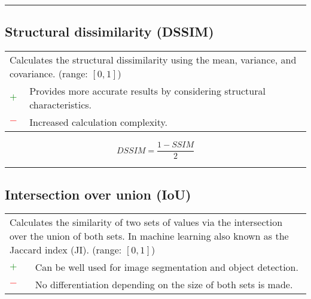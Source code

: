 \documentclass{article}
\begin{document}
\hrule


\subsection[Structural dissimilarity (DSSIM)]{Structural dissimilarity (DSSIM) \cite{wang2004image, ghodrati2019mr}}

\begin{table}[H]\centering
	\begin{tabular}{m{}m{}}
		\multicolumn{2}{m{0.95\textwidth}}{Calculates the structural dissimilarity using the mean, variance, and covariance. (range: $[0, 1]$)} \\
		\textcolor{Green}{$+$} & Provides more accurate results by considering structural characteristics. \cite{wang2004image} \\
		\textcolor{Red}{$-$}   & Increased calculation complexity.
	\end{tabular}
\end{table}

\begin{equation}
	\textit{DSSIM} = \dfrac{1 - \textit{SSIM}}{2}
%
	\label{equation:DSSIM}
\end{equation}

\hrule


\subsection[Intersection over union (IoU)]{Intersection over union (IoU) \cite{jaccard1912distribution, murphy1996finley, rezatofighi2019generalized, zou2023object}}

\begin{table}[H]\centering
	\begin{tabular}{m{}m{}}
		\multicolumn{2}{m{0.95\textwidth}}{Calculates the similarity of two sets of values via the intersection over the union of both sets. In machine learning also known as the Jaccard index (JI). (range: $[0, 1]$)} \\
		\textcolor{Green}{$+$} & Can be well used for image segmentation and object detection. \\
		\textcolor{Red}{$-$}   & No differentiation depending on the size of both sets is made.
	\end{tabular}
\end{table}
\end{document}
